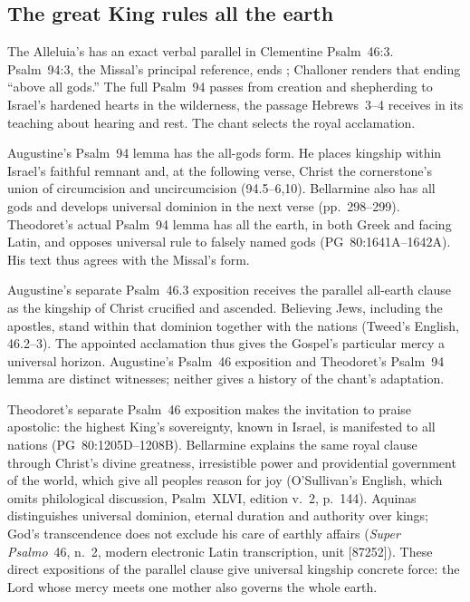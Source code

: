 \subsection*{The great King rules all the earth\enspace{}}

The Alleluia's  has an exact verbal
parallel in Clementine Psalm~46:3. Psalm~94:3, the Missal's principal
reference, ends ; Challoner renders that ending
``above all gods.'' The full Psalm~94 passes from creation and shepherding
to Israel's hardened hearts in the wilderness, the passage Hebrews~3--4
receives in its teaching about hearing and rest. The chant selects the
royal acclamation.

Augustine's Psalm~94 lemma has the all-gods form. He places kingship within
Israel's faithful remnant and, at the following verse, Christ the
cornerstone's union of circumcision and uncircumcision (94.5--6,10).
Bellarmine also has all gods and develops universal dominion in the next
verse (pp.~298--299). Theodoret's actual Psalm~94 lemma has all the earth,
in both Greek and facing Latin, and opposes universal rule to falsely
named gods (PG~80:1641A--1642A). His text thus agrees with the Missal's
form.

Augustine's separate Psalm~46.3 exposition receives the parallel all-earth
clause as the kingship of Christ crucified and ascended. Believing Jews,
including the apostles, stand within that dominion together with the nations
(Tweed's English, 46.2--3). The appointed acclamation thus gives the
Gospel's particular mercy a universal horizon. Augustine's Psalm~46 exposition
and Theodoret's Psalm~94 lemma are distinct witnesses; neither gives a
history of the chant's adaptation.

Theodoret's separate Psalm~46 exposition makes the invitation to praise
apostolic: the highest King's sovereignty, known in Israel, is manifested
to all nations (PG~80:1205D--1208B). Bellarmine explains the same royal
clause through Christ's divine greatness, irresistible power and
providential government of the world, which give all peoples reason for
joy (O'Sullivan's English, which omits philological discussion,
Psalm~XLVI, edition v.~2, p.~144). Aquinas distinguishes universal
dominion, eternal duration and authority over kings; God's transcendence
does not exclude his care of earthly affairs (\emph{Super Psalmo}~46,
n.~2, modern electronic Latin transcription, unit [87252]). These direct
expositions of the parallel clause give universal kingship concrete force:
the Lord whose mercy meets one mother also governs the whole earth.


